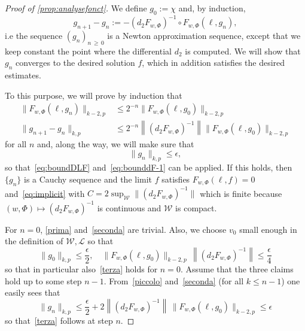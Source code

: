 \documentclass[AHL,Unicode,longabstracts,published]{cedram}
\newcommand{\clL}{\mathcal{L}}
\newcommand{\clW}{\mathcal{W}}
\newcommand{\norm}[1]{\lVert #1 \rVert}
\begin{document}
\begin{proof}[Proof of \cref{prop:analysefonct}]
We define $g_0 := \chi$ and, by induction,
\begin{equation}\label{eq:gngn-1}
g_{n+1} - g_{n} := -(d_2F_{w,\Phi})^{-1} \circ F_{w,\Phi}(
\ell, g_n),
\end{equation}
i.e the sequence $(g_{n})_{n\,\geq\,0}$ is a Newton approximation sequence, except that we keep constant the point where the differential $d_2$ is computed. We will show that $g_n$ converges to the desired solution $f$, which in addition satisfies the desired estimates.

To this purpose, we will prove by induction that
\begin{align}
\norm{F_{w,\Phi}(\ell, g_n)}_{{k-2, p}} &\leq 2^{-n}
\norm{F_{w,\Phi}(\ell, g_0)}_{{k-2, p}}\label{prima}\\
\norm{g_{n+1} - g_n}_{{k, p}} &\leq 2^{-n} \left\| (d_2F_{w,\Phi})^{-1} \right\| \norm{F_{w,\Phi}(\ell, g_0)}_{{k-2, p}}\label{seconda}
\end{align}
for all $n$ and, along the way, we will make sure that
\begin{equation}\label{terza}
\|g_n\|_{k,p}\le \epsilon,
\end{equation}
so that~\eqref{eq:boundDLF} and~\eqref{eq:bounddF-1} can be applied. If this holds, then $\{g_n\}$ is a Cauchy sequence and the limit $f$ satisfies $F_{w,\Phi}(\ell,f)=0$ and~\eqref{eq:implicit} with $C=2\sup_{\clW}\|(d_2 F_{w,\Phi})^{-1}\|$ which is finite because $(w,\Phi)\mapsto (d_2 F_{w,\Phi})^{-1}$ is continuous and $\clW$ is compact.

For $n=0$, \eqref{prima} and~\eqref{seconda} are trivial. Also, we choose $v_0$ small enough in the definition of $\clW,\clL$ so that
\begin{equation}\label{piccolo}
\|g_0\|_{k,p}\le \frac\epsilon2, \quad \|F_{w,\Phi}(\ell,g_0)\|_{k-2,p}\, \left\|(d_2 F_{w,\Phi})^{-1}\right\|\le \frac\epsilon4
\end{equation}
so that in particular also~\eqref{terza} holds for $n=0$. Assume that the three claims hold up to some step $n-1$. From~\eqref{piccolo} and~\eqref{seconda} (for all $k\le n-1$) one easily sees that
\begin{equation}
\|g_n\|_{k,p}\le \frac\epsilon2+2 \left\|(d_2 F_{w,\Phi})^{-1}\right\|\, \|F_{w,\Phi}(\ell,g_0)\|_{k-2,p}\le \epsilon
\end{equation}
so that~\eqref{terza} follows at step $n$.


\end{proof}
\end{document}
